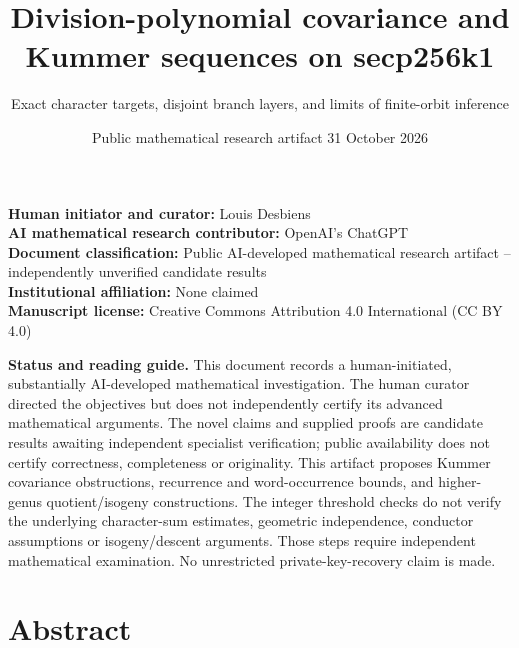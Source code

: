 \documentclass[
  11pt,
  a4paper,
]{article}
\title{Division-polynomial covariance and Kummer sequences on secp256k1}
\subtitle{Exact character targets, disjoint branch layers, and limits of finite-orbit inference}
\author{}
\date{Public mathematical research artifact \textbar{} 31 October 2026}
\begin{document}
\maketitle

\textbf{Human initiator and curator:} Louis Desbiens\\
\textbf{AI mathematical research contributor:} OpenAI's ChatGPT\\
\textbf{Document classification:} Public AI-developed mathematical
research artifact -- independently unverified candidate results\\
\textbf{Institutional affiliation:} None claimed\\
\textbf{Manuscript license:} Creative Commons Attribution 4.0 International (CC BY 4.0)

\textbf{Status and reading guide.} This document records a
human-initiated, substantially AI-developed mathematical investigation.
The human curator directed the objectives but does not independently
certify its advanced mathematical arguments. The novel claims and
supplied proofs are candidate results awaiting independent specialist
verification; public availability does not certify correctness,
completeness or originality. This artifact proposes Kummer covariance
obstructions, recurrence and word-occurrence bounds, and higher-genus
quotient/isogeny constructions. The integer threshold checks do not
verify the underlying character-sum estimates, geometric independence,
conductor assumptions or isogeny/descent arguments. Those steps require
independent mathematical examination. No unrestricted
private-key-recovery claim is made.

\section{Abstract}\label{abstract}
\end{document}
